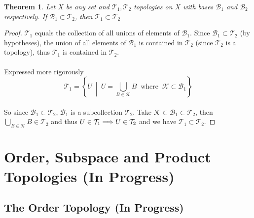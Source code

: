 \documentclass{article}
\newtheorem{theorem}{Theorem}[section]
\theoremstyle{remark}
\theoremstyle{definition}
\newcommand{\simplies}{\DOTSB\Longrightarrow}
\begin{document}
\hrulefill

\bigskip
\medskip

\begin{theorem}
Let $X$ be any set and $\mathcal{T}_1, \mathcal{T}_2$ topologies on $X$ with bases $\mathcal{B}_1$ and $\mathcal{B}_2$ respectively. If $\mathcal{B}_1 \subset \mathcal{T}_2$, then $\mathcal{T}_1 \subset \mathcal{T}_2$
\end{theorem}

\begin{proof}
$\mathcal{T}_1$ equals the collection of all unions of elements of $\mathcal{B}_1$. Since $\mathcal{B}_1 \subset \mathcal{T}_2$ (by hypotheses), the union of all elements of $\mathcal{B}_1$ is contained in $\mathcal{T}_2$ (since $\mathcal{T}_2$ is a topology), thus $\mathcal{T}_1$ is contained in $\mathcal{T}_2$. 
\\ \\
Expressed more rigorously $$\mathcal{T}_1 = \left\{U \ \middle| \ U = \bigcup_{B \in \mathcal{K}}B \ \text{ where } \ \mathcal{K} \subset \mathcal{B}_1\right\}$$
\\
So since  $\mathcal{B}_1 \subset \mathcal{T}_2$, $\mathcal{B}_1$ is a subcollection $\mathcal{T}_2$. Take $\mathcal{K} \subset \mathcal{B}_1 \subset \mathcal{T}_2$, then $\bigcup_{B \in \mathcal{K}}B \in \mathcal{T}_2$ and thus $U \in \mathcal{T}_1 \simplies U \in \mathcal{T}_2$ and we have $\mathcal{T}_1 \subset \mathcal{T}_2$.
\end{proof}

\newpage

\section{Order, Subspace and Product Topologies (In Progress)}

\bigskip

\subsection{The Order Topology (In Progress)}
\bigskip
\end{document}

